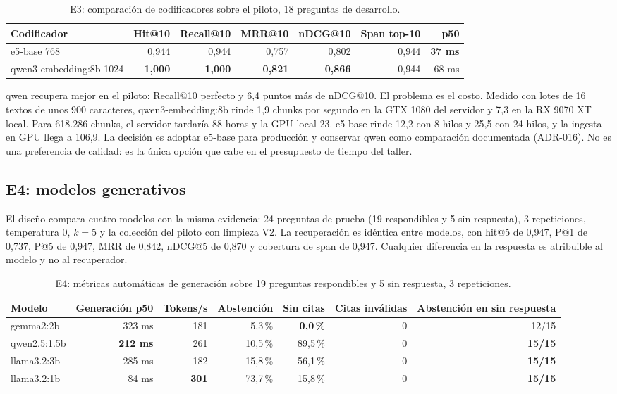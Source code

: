 \documentclass[11pt]{tg_usta}
\begin{document}
\begin{table}[htbp]
\centering
\footnotesize
\begin{tabular}{@{}lrrrrrr@{}}
\toprule
Codificador & Hit@10 & Recall@10 & MRR@10 & nDCG@10 & Span top-10 & p50 \\
\midrule
e5-base 768 & 0,944 & 0,944 & 0,757 & 0,802 & 0,944 & \textbf{37 ms} \\
qwen3-embedding:8b 1024 & \textbf{1,000} & \textbf{1,000} & \textbf{0,821} & \textbf{0,866} & 0,944 & 68 ms \\
\bottomrule
\end{tabular}
\caption{E3: comparación de codificadores sobre el piloto, 18 preguntas de desarrollo.}
\label{tab:e3}
\end{table}

qwen recupera mejor en el piloto: Recall@10 perfecto y 6,4 puntos más de nDCG@10. El problema es el costo. Medido con lotes de 16 textos de unos 900 caracteres, qwen3-embedding:8b rinde 1,9 chunks por segundo en la GTX 1080 del servidor y 7,3 en la RX 9070 XT local. Para 618.286 chunks, el servidor tardaría 88 horas y la GPU local 23. e5-base rinde 12,2 con 8 hilos y 25,5 con 24 hilos, y la ingesta en GPU llega a 106,9. La decisión es adoptar e5-base para producción y conservar qwen como comparación documentada (ADR-016). No es una preferencia de calidad: es la única opción que cabe en el presupuesto de tiempo del taller.

\subsection{E4: modelos generativos}

El diseño compara cuatro modelos con la misma evidencia: 24 preguntas de prueba (19 respondibles y 5 sin respuesta), 3 repeticiones, temperatura 0, $k=5$ y la colección del piloto con limpieza V2. La recuperación es idéntica entre modelos, con hit@5 de 0,947, P@1 de 0,737, P@5 de 0,947, MRR de 0,842, nDCG@5 de 0,870 y cobertura de span de 0,947. Cualquier diferencia en la respuesta es atribuible al modelo y no al recuperador.

\begin{table}[htbp]
\centering
\footnotesize
\begin{tabular}{@{}lrrrrrr@{}}
\toprule
Modelo & Generación p50 & Tokens/s & Abstención & Sin citas & Citas inválidas & Abstención en sin respuesta \\
\midrule
gemma2:2b & 323 ms & 181 & 5,3\,\% & \textbf{0,0\,\%} & 0 & 12/15 \\
qwen2.5:1.5b & \textbf{212 ms} & 261 & 10,5\,\% & 89,5\,\% & 0 & \textbf{15/15} \\
llama3.2:3b & 285 ms & 182 & 15,8\,\% & 56,1\,\% & 0 & \textbf{15/15} \\
llama3.2:1b & 84 ms & \textbf{301} & 73,7\,\% & 15,8\,\% & 0 & \textbf{15/15} \\
\bottomrule
\end{tabular}
\caption{E4: métricas automáticas de generación sobre 19 preguntas respondibles y 5 sin respuesta, 3 repeticiones.}
\label{tab:e4}
\end{table}
\end{document}
